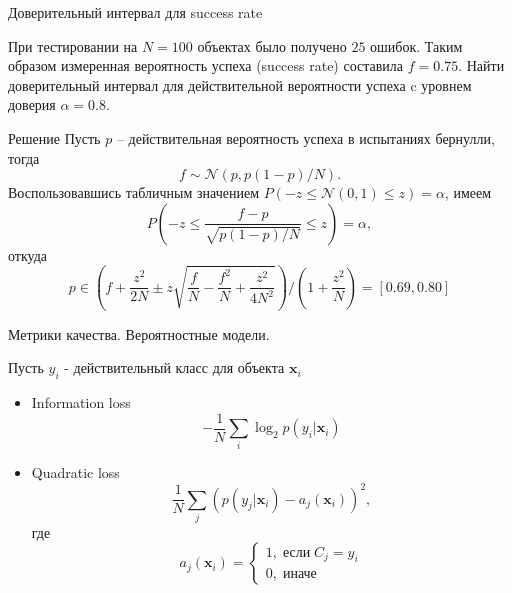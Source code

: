 \documentclass[aspectratio=169]{beamer}
\begin{document}
\begin{frame}{Доверительный интервал для success rate}

\begin{small}

При тестировании на $N=100$ объектах было получено $25$ ошибок. Таким образом измеренная вероятность успеха (success rate) составила $f=0.75$. Найти доверительный интервал для действительной вероятности успеха c уровнем доверия $\alpha=0.8$. 

\begin{exampleblock}{Решение}
Пусть $p$ -- действительная вероятность успеха в испытаниях бернулли, тогда
\[
f \sim \mathcal{N}\left( p, p(1-p)/N \right).
\]
Воспользовавшись табличным значением $P(-z \leq \mathcal{N}(0,1) \leq z) = \alpha$, имеем
\[
P\left(-z \leq \frac{f-p}{\sqrt{p(1-p)/N}} \leq z \right) = \alpha,
\]
откуда
\[
p \in \left(f + \frac{z^2}{2N} \pm z \sqrt{\frac f N - \frac{f^2}{N}+\frac{z^2}{4N^2}} \right)/\left(1 + \frac {z^2}{N} \right) = [0.69, 0.80]
\]
\end{exampleblock}

\end{small}
  
\end{frame}

\begin{frame}{Метрики качества. Вероятностные модели.}

Пусть $y_i$ - действительный класс для объекта $\mathbf{x}_i$
\begin{itemize}
\item  Information loss 
\[
- \frac 1 N \sum_i \log_2 p(y_i | \mathbf{x}_i)
\]
\item Quadratic loss 
\[
\frac 1 N \sum_j (p(y_j | \mathbf{x}_i) - a_j(\mathbf{x}_i))^2,
\] 
где
\[
a_j(\mathbf{x}_i) = \begin{cases}
1, \;\text{если}\;C_j = y_i\\
0, \;\text{иначе}
\end{cases} 
\]
\end{itemize}

\end{frame}
\end{document}
